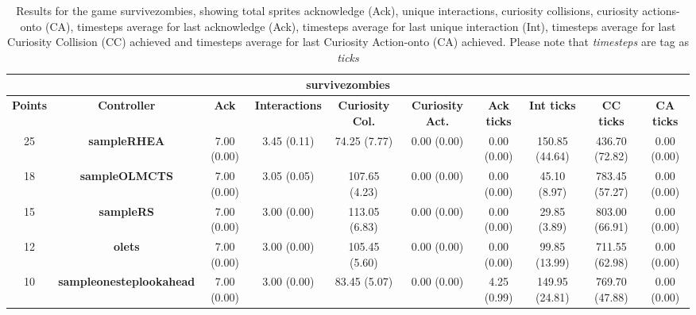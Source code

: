 \begin{table*}[!t]
\begin{center}
\begin{adjustbox}{width=1\textwidth}
\begin{tabular}{|c|c|c|c|c|c|c|c|c|c|}
\multicolumn{10}{c}{\textbf{survivezombies}}\\
\hline
\textbf{Points} & \textbf{Controller} & \textbf{Ack} & \textbf{Interactions} & \textbf{Curiosity Col.} & \textbf{Curiosity Act.} & \textbf{Ack ticks} & \textbf{Int ticks} & \textbf{CC ticks} & \textbf{CA ticks}\\
\hline
25 & \textbf{sampleRHEA} & 7.00 (0.00) & 3.45 (0.11) & 74.25 (7.77) & 0.00 (0.00) & 0.00 (0.00) & 150.85 (44.64) & 436.70 (72.82) & 0.00 (0.00)
 \\
\hline
18 & \textbf{sampleOLMCTS} & 7.00 (0.00) & 3.05 (0.05) & 107.65 (4.23) & 0.00 (0.00) & 0.00 (0.00) & 45.10 (8.97) & 783.45 (57.27) & 0.00 (0.00)
 \\
\hline
15 & \textbf{sampleRS} & 7.00 (0.00) & 3.00 (0.00) & 113.05 (6.83) & 0.00 (0.00) & 0.00 (0.00) & 29.85 (3.89) & 803.00 (66.91) & 0.00 (0.00)
 \\
\hline
12 & \textbf{olets} & 7.00 (0.00) & 3.00 (0.00) & 105.45 (5.60) & 0.00 (0.00) & 0.00 (0.00) & 99.85 (13.99) & 711.55 (62.98) & 0.00 (0.00)
 \\
\hline
10 & \textbf{sampleonesteplookahead} & 7.00 (0.00) & 3.00 (0.00) & 83.45 (5.07) & 0.00 (0.00) & 4.25 (0.99) & 149.95 (24.81) & 769.70 (47.88) & 0.00 (0.00)
 \\
\hline
\end{tabular}
\end{adjustbox}
\caption{Results for the game survivezombies, showing total sprites acknowledge (Ack), unique interactions, curiosity collisions, curiosity actions-onto (CA), timesteps average for last acknowledge (Ack),  timesteps average for last unique interaction (Int), timesteps average for last Curiosity Collision (CC) achieved and timesteps average for last Curiosity Action-onto (CA) achieved. Please note that \textit{timesteps} are tag as \textit{ticks}}
\label{tab:weights}
\end{center}
\end{table*}
